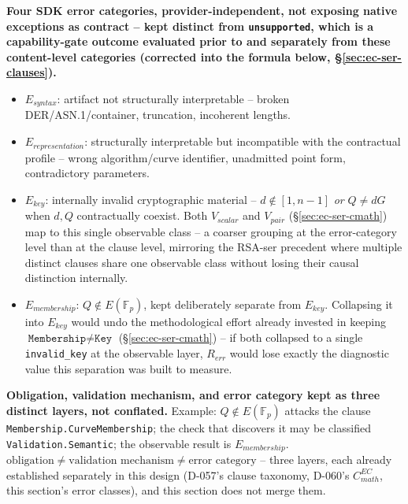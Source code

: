 \documentclass[11pt,a4paper]{article}
\begin{document}
\textbf{Four SDK error categories, provider-independent, not exposing native exceptions as contract -- kept distinct from \texttt{unsupported}, which is a capability-gate outcome evaluated prior to and separately from these content-level categories (corrected into the formula below, \S\ref{sec:ec-ser-clauses}).}
\begin{itemize}
\item $E_{syntax}$: artifact not structurally interpretable -- broken DER/ASN.1/container, truncation, incoherent lengths.
\item $E_{representation}$: structurally interpretable but incompatible with the contractual profile -- wrong algorithm/curve identifier, unadmitted point form, contradictory parameters.
\item $E_{key}$: internally invalid cryptographic material -- $d\notin[1,n-1]$ \emph{or} $Q\neq dG$ when $d,Q$ contractually coexist. Both $V_{scalar}$ and $V_{pair}$ (\S\ref{sec:ec-ser-cmath}) map to this single observable class -- a coarser grouping at the error-category level than at the clause level, mirroring the RSA-ser precedent where multiple distinct clauses share one observable class without losing their causal distinction internally.
\item $E_{membership}$: $Q\notin E(\mathbb{F}_p)$, kept deliberately separate from $E_{key}$. Collapsing it into $E_{key}$ would undo the methodological effort already invested in keeping $\texttt{Membership}\neq\texttt{Key}$ (\S\ref{sec:ec-ser-cmath}) -- if both collapsed to a single \texttt{invalid\_key} at the observable layer, $R_{err}$ would lose exactly the diagnostic value this separation was built to measure.
\end{itemize}

\textbf{Obligation, validation mechanism, and error category kept as three distinct layers, not conflated.} Example: $Q\notin E(\mathbb{F}_p)$ attacks the clause \texttt{Membership.CurveMembership}; the check that discovers it may be classified \texttt{Validation.Semantic}; the observable result is $E_{membership}$. $\text{obligation} \neq \text{validation mechanism} \neq \text{error category}$ -- three layers, each already established separately in this design (D-057's clause taxonomy, D-060's $C_{math}^{EC}$, this section's error classes), and this section does not merge them.
\end{document}
